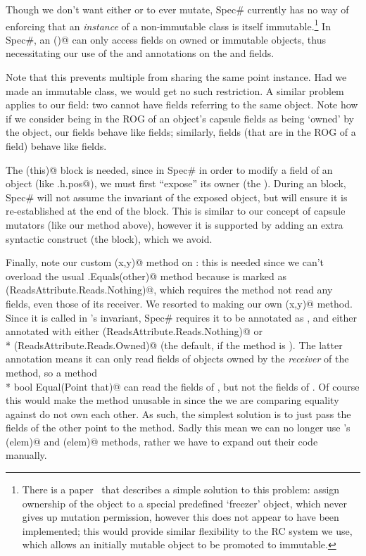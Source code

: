 Though we don't want either \Q@pos@ or \Q@path@ to ever mutate, Spec\# currently has no way of enforcing that an \emph{instance} of a non-immutable class is itself immutable.\footnote{There is a paper~\cite{DBLP:conf/vstte/LeinoMW08} that describes a simple solution to this problem: assign ownership of the object to a special predefined `freezer' object, which never gives up mutation permission, however this does not appear to have been implemented; this would provide similar flexibility to the RC system we use, which allows an initially mutable object to be promoted to immutable.} In Spec\#, an \Q@invariant()@ can only access fields on owned or immutable objects, thus necessitating our use of the \Q@Peer@ and \Q@Rep@ annotations on the \Q@pos@ and \Q@path@ fields.

Note that this prevents multiple \Q@Cage@s from sharing the same point instance.
Had we made \Q@Point@ an immutable class, we would get no such restriction. A similar problem applies to our \Q@path@ field: two \Q@Cage@s cannot have \Q@path@ fields referring to the same object.
Note how if we consider being in the ROG of an object's capsule fields as being `owned' by the object, our \Q@capsule@ fields behave like \Q@Rep@ fields; similarly, \Q@mut@ fields (that are in the ROG of a \Q@capsule@ field) behave like \Q@Peer@ fields.

The \Q@expose(this)@ block is needed, since in Spec\# in order to modify a field of an object (like \Q@this.h.pos@), we must first ``expose'' its owner (the \Q@Cage@). During an \Q@expose@ block, Spec\# will not assume the invariant of the exposed object, but will ensure it is re-established at the end of the block. This is similar to our concept of capsule mutators (like our \Q@moveTo@ method above), however it is supported by adding an extra syntactic construct (the \Q@expose@ block), which we avoid.

Finally, note our custom \Q@Equal(x,y)@ method on \Q@Point@: this is needed since we can't overload the usual \Q@Object.Equals(other)@ method because is marked as \Q@Reads(ReadsAttribute.Reads.Nothing)@, which requires the method not read any fields, even those of its receiver.
We resorted to making our own \Q@Equal(x,y)@ method. Since it is called in \Q@Cage@'s invariant, Spec\# requires it to be annotated as \Q@Pure@, and either annotated with either \Q@Reads(ReadsAttribute.Reads.Nothing)@ or \\* \Q@Reads(ReadsAttribute.Reads.Owned)@ (the default, if the method is \Q@Pure@). The latter annotation means it can only read fields of objects owned by the \emph{receiver} of the method, so a method\\* \Q@[Pure] bool Equal(Point that)@ can read the fields of \Q@this@, but not the fields of \Q@that@. Of course this would make the method unusable in \Q@Cage@ since the \Q@Point@s we are comparing equality against do not own each other. As such, the simplest solution is to just pass the fields of the other point to the method.
Sadly this mean we can no longer use \Q@List@'s \Q@Contains(elem)@ and \Q@IndexOf(elem)@ methods, rather we have to expand out their code manually.


